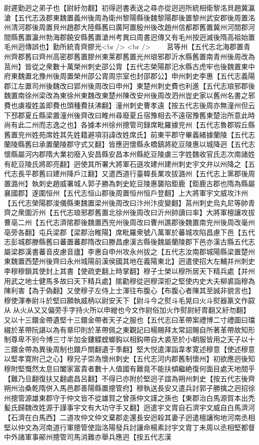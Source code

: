 尉遲勤迥之弟子也【尉紆勿翻】初得迥書表送之尋亦從迥迥所統相衛黎洺貝趙冀瀛滄【五代志汲郡東魏置義州後周為衛州黎陽縣後魏黎陽郡後置黎州武安郡後周置洺州清河郡後周置貝州趙郡大陸縣舊曰廣阿置殷州後改趙州信都郡舊置冀州河間郡河間縣舊置瀛州勃海郡饒安縣舊置滄州考異曰周書迥傳又有毛州按迥滅後隋高祖始置毛州迥傳誤也】勤所統青齊膠光<br />
<br />
　　莒等州【五代志北海郡置青州齊郡舊曰齊州高密郡舊置膠州東莱郡舊置光州琅邪郡沂水縣舊置南青州後周改為莒州】皆從之衆數十萬榮州刺史邵公胄【五代志榮陽郡汜水縣古虎牢也後魏置東中府東魏置北豫州後周置榮州邵公胄周宗室也封邵郡公】申州刺史李惠【五代志義陽郡江左置司州後魏改曰郢州後周改曰申州】東楚州刺史費也利進【五代志琅邪郡後魏置南徐州梁改為東徐州東魏改東楚州陳改安州後周改泗州豈史家以舊州名書之邪費也虜複姓盖即費也頭種費扶沸翻】潼州刺史曹孝遠【按五代志後周亦無潼州但云下邳郡夏丘縣梁置潼州後齊改曰睢州尋廢夏丘宿豫相去不遠宿豫舊東楚治所意此時尚有此二州而志逸之也】各據本州徐州摠管司録席毗羅據兖州【五代志魯郡瑕丘縣舊置兖州姓苑席姓其先姓籍避項羽諱改姓席氏】前東平郡守畢義緒據蘭陵【五代志蘭陵縣舊曰承置蘭陵郡守式又翻】皆應迥懷縣永橋鎮將紇豆陵惠以城降迥【五代志懷縣屬河内郡隋大業初廢入安昌縣安昌本州縣紇豆陵虜三字姓魏收官氏志次南諸姓有紇豆陵氏將即亮翻】迥使其所署大將軍石遜攻建州建州刺史宇文弁以州降之【五代志長平郡舊曰建州降戶江翻】又遣西道行臺韓長業攻拔潞州【五代志上黨郡後周置潞州】執刺史趙威署城人郭子勝為刺史紇豆陵惠襲陷鉅鹿【鉅鹿古郡也隋為縣屬襄國郡】遂圍恒州【五代志恒山郡後周置恒州恒戶登翻】上大將軍宇文威攻汴州【五代志榮陽郡浚儀縣東魏置梁州後周改曰汴州汴皮變翻】莒州刺史烏丸尼等帥青齊之衆圍沂州【五代志琅邪郡舊置北徐州後周改曰沂州帥讀曰率】大將軍檀讓攻拔曹亳二州【五代志濟隂郡後魏置西兖州後周改曰曹州譙郡後魏置南兖州後周改毫州亳旁各翻】屯兵梁郡【梁郡治睢陽】席毗羅衆號八萬軍於蕃城攻陷昌慮下邑【五代志彭城郡滕縣舊曰蕃置蕃郡隋改曰滕昌慮漢古縣後魏屬蘭陵郡下邑亦漢古縣五代志屬梁郡漢書蕃音皮慮音廬】李惠自申州攻永州拔之【五代志汝南郡城陽縣梁置楚州東魏置西楚州後齊曰永州城陽前漢侯國其地在義陽東北】迥遣使招大左輔并州刺史李穆穆鎻其使封上其書【使疏吏翻上時掌翻】穆子士榮以穆所居天下精兵處【并州用武之地士健馬多故曰天下精兵處】隂勸穆從迥穆深拒之堅使内史大夫柳裘詣穆為陳利害【為于偽翻】又使穆子左侍上士渾往布腹心【布腹心者陳其至誠非貌言也】穆使渾奉尉斗於堅曰願執威柄以尉安天下【尉斗今之熨斗毛晃曰火斗熨器篆文作叞从从火从又又偏旁手字持火所以申繒也今文作尉俗加火作熨尉紆胄翻又紆勿翻】又以十三鐶金帶遺堅十三鐶金帶者天子之服也【五代志曰革帶案禮博二寸禮圖曰璫綴於革帶阮諶以為有章印則於革帶佩之東觀記曰楊賜拜太常詔賜自所著革帶故知形制尊卑不别今博三寸半加金鏤䚢螳螂鈎以相鈎帶自大裘至於小朝服皆用之天子以十三鐶金帶為異後周制也鐶戶關翻遺于季翻】堅大悦遣渾詣韋孝寛述穆意【使述穆意以堅孝寛附己之心】穆兄子崇為懷州刺史【五代志河内郡舊制懷州】初欲應迥後知穆附堅慨然太息曰闔家富貴者數十人值國有難竟不能扶傾繼絶復何面目處天地間乎【難乃旦翻復扶又翻處昌呂翻】不得已亦附於堅迥子誼為朔州刺史【按五代志後齊朔州治桑乾隋併入馬邑郡善陽縣置摠管府】穆執送長安又遣兵討郭子勝擒之迥招徐州摠管源雄東郡守于仲文皆不從雄賀之曾孫仲文謹之孫也【東郡治白馬源賀本出禿髪氏歸魏改姓源于謹事宇文有大功守手又翻】迥遣宇文胄自石濟宇文威自白馬濟河【石濟在白馬西】二道攻仲文仲文棄郡走還長安迥殺其妻子迥遣檀讓徇地河南丞相堅以仲文為河南道行軍摠管使詣洛陽發兵討讓命楊素討宇文胄丁未周以丞相堅都督中外諸軍事鄖州摠管司馬消難亦舉兵應迥【按五代志漢